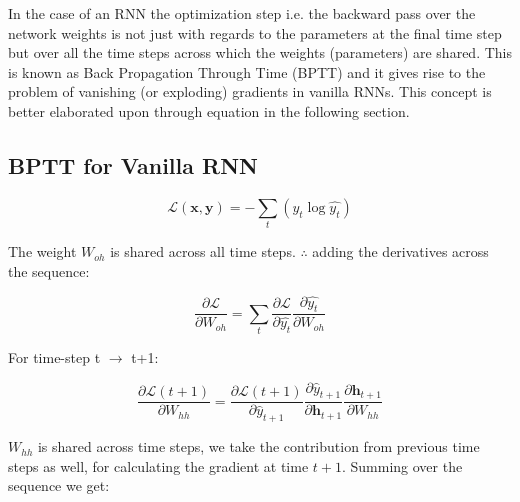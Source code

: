 In the case of an RNN the optimization step i.e. the backward pass over the network weights is not just with regards to the parameters at the final time step but over all the time steps across which the weights (parameters) are shared. This is known as Back Propagation Through Time (BPTT) \citep{Werbos1990} and it gives rise to the problem of vanishing (or exploding) gradients in vanilla RNNs. This concept is better elaborated upon through equation in the following section.

\subsection{BPTT for Vanilla RNN}
\begin{equation}
\mathbf{\mathcal{L}\left(x,y\right)} = - \sum_{t}\left(y_t \log\hat{y_t}\right)
\end{equation}

The weight $W_{oh}$ is shared across all time steps. $\therefore$ adding the derivatives across the sequence:

\begin{equation}
\frac{\partial \mathbf{\mathcal{L}}}{\partial W_{oh}} = \sum_{t}\frac{\partial \mathbf{\mathcal{L}}}{\partial \hat{y_t}} \frac{\partial  \hat{y_t}}{\partial W_{oh}}
\end{equation}

For time-step t $\rightarrow$ t+1:

\begin{equation}
\frac{\partial \mathbf{\mathcal{L}}\left(t+1\right)}{\partial W_{hh}} = \frac{\partial \mathbf{\mathcal{L}}\left(t+1\right)}{\partial \hat{y}_{t+1}} \frac{\partial  \hat{y}_{t+1}}{\partial \mathbf{h}_{t+1}} \frac{\partial \mathbf{h}_{t+1}}{\partial W_{hh}}
\end{equation}

$W_{hh}$ is shared across time steps, we take the contribution from previous time steps as well, for calculating the gradient at time $t+1$. Summing over the sequence we get:


